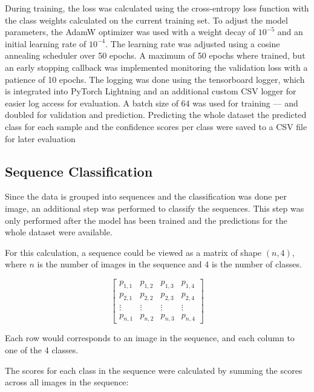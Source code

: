     During training, the loss was calculated using the cross-entropy loss function with the class weights calculated on the current training set.
    To adjust the model parameters, the AdamW optimizer \autocite{loshchilovDecoupledWeightDecay2019} was used with a weight decay of \(10^{-5}\) and an initial learning rate of \(10^{-4}\).
    The learning rate was adjusted using a cosine annealing scheduler \autocite{loshchilovSGDRStochasticGradient2017} over 50 epochs.
    A maximum of 50 epochs where trained, but an early stopping callback was implemented monitoring the validation loss with a patience of 10 epochs.
    The logging was done using the tensorboard logger, which is integrated into PyTorch Lightning and an additional custom \ac{CSV} logger for easier log access for evaluation.
    A batch size of 64 was used for training --- and doubled for validation and prediction.
    Predicting the whole dataset the predicted class for each sample and the confidence scores per class were saved to a \ac{CSV} file for later evaluation

    \subsection{Sequence Classification} 
    Since the data is grouped into sequences and the classification was done per image, an additional step was performed to classify the sequences.
    This step was only performed after the model has been trained and the predictions for the whole dataset were available.

    For this calculation, a sequence could be viewed as a matrix of shape \((n, 4)\), where \(n\) is the number of images in the sequence and 4 is the number of classes.

    \[
    \begin{bmatrix}
    p_{1,1} & p_{1,2} & p_{1,3} & p_{1,4} \\
    p_{2,1} & p_{2,2} & p_{2,3} & p_{2,4} \\
    \vdots  & \vdots  & \vdots  & \vdots  \\
    p_{n,1} & p_{n,2} & p_{n,3} & p_{n,4}
    \end{bmatrix}
    \]

    Each row would corresponds to an image in the sequence, and each column to one of the 4 classes.

    The scores for each class in the sequence were calculated by summing the scores across all images in the sequence:

